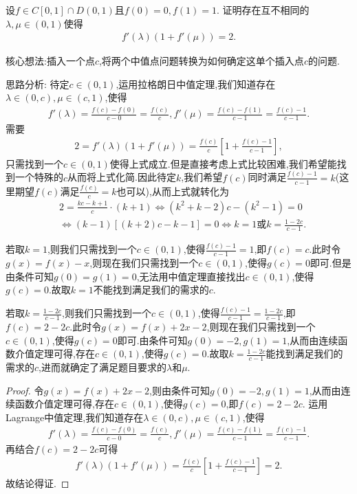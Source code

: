 \documentclass[../../main.tex]{subfiles}
\begin{document}
\begin{example}
设\(f\in C[0,1]\cap D(0,1)\)且\(f(0)=0,f(1)=1\). 证明存在互不相同的\(\lambda,\mu\in(0,1)\)使得
\begin{align*}
f'(\lambda)(1 + f'(\mu))=2.
\end{align*} 
\end{example}
\begin{note}
核心想法:插入一个点$c$,将两个中值点问题转换为如何确定这单个插入点$c$的问题.
\end{note}
\begin{remark}
思路分析:
待定\(c\in(0,1)\),运用拉格朗日中值定理,我们知道存在\(\lambda\in(0,c),\mu\in(c,1)\),使得
\begin{align*}
f'(\lambda)=\frac{f(c)-f(0)}{c - 0}=\frac{f(c)}{c},f'(\mu)=\frac{f(c)-f(1)}{c - 1}=\frac{f(c)-1}{c - 1}.
\end{align*}
需要
\begin{align*}
2=f'(\lambda)(1 + f'(\mu))=\frac{f(c)}{c}\left[1+\frac{f(c)-1}{c - 1}\right],
\end{align*}
只需找到一个\(c\in(0,1)\)使得上式成立.但是直接考虑上式比较困难,我们希望能找到一个特殊的$c$从而将上式化简.因此待定$k$,我们希望$f(c)$同时满足$\frac{f(c)-1}{c-1}=k$(这里期望$f(c)$满足$\frac{f(c)}{c}=k$也可以),从而上式就转化为
\begin{align*}
&2=\frac{kc-k+1}{c}\cdot \left( k+1 \right) \Leftrightarrow \left( k^2+k-2 \right) c-\left( k^2-1 \right) =0
\\
&\Leftrightarrow \left( k-1 \right) \left[ \left( k+2 \right) c-k-1 \right] =0\Leftrightarrow k=1\text{或}k=\frac{1-2c}{c-1}.
\end{align*}

若取\(k = 1\),则我们只需找到一个\(c\in(0,1)\),使得\(\frac{f(c)-1}{c - 1}=1\),即\(f(c)=c\).此时令\(g(x)=f(x)-x\),则现在我们只需找到一个\(c\in(0,1)\),使得\(g(c)=0\)即可.但是由条件可知\(g(0)=g(1)=0\),无法用中值定理直接找出\(c\in(0,1)\),使得\(g(c)=0\).故取$k=1$不能找到满足我们的需求的$c$.

若取\(k=\frac{1 - 2c}{c - 1}\),则我们只需找到一个\(c\in(0,1)\),使得\(\frac{f(c)-1}{c - 1}=\frac{1 - 2c}{c - 1}\),即\(f(c)=2 - 2c\).此时令\(g(x)=f(x)+2x - 2\),则现在我们只需找到一个\(c\in(0,1)\),使得\(g(c)=0\)即可.由条件可知\(g(0)=-2,g(1)=1\),从而由连续函数介值定理可得,存在\(c\in(0,1)\),使得\(g(c)=0\).故取$k=\frac{1 - 2c}{c - 1}$能找到满足我们的需求的$c$,进而就确定了满足题目要求的\(\lambda\)和\(\mu\). 
\end{remark}
\begin{proof}
令\(g(x)=f(x)+2x - 2\),则由条件可知\(g(0)=-2,g(1)=1\),从而由连续函数介值定理可得,存在\(c\in(0,1)\),使得\(g(c)=0\),即\(f(c)=2 - 2c\). 
运用Lagrange中值定理,我们知道存在\(\lambda\in(0,c),\mu\in(c,1)\),使得
\begin{align*}
f'(\lambda)=\frac{f(c)-f(0)}{c - 0}=\frac{f(c)}{c},f'(\mu)=\frac{f(c)-f(1)}{c - 1}=\frac{f(c)-1}{c - 1}.
\end{align*}
再结合$f(c)=2-2c$可得
\begin{align*}
f' (\lambda )(1+f' (\mu ))=\frac{f(c)}{c}\left[ 1+\frac{f(c)-1}{c-1} \right] =2.
\end{align*}
故结论得证.
\end{proof}
\end{document}
